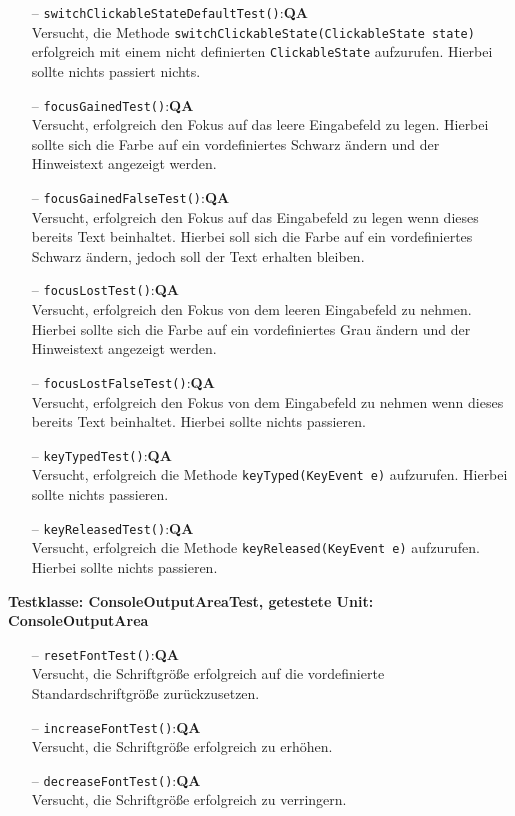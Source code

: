\documentclass[parskip=full,11pt,twoside]{scrartcl}
\def\qa{\hfill\textbf{QA}}
\begin{document}
\begin{itemize}
	\item[--] \texttt{switchClickableStateDefaultTest()}:\qa\\
	Versucht, die Methode \texttt{switchClickableState(ClickableState state)}\\erfolgreich mit einem nicht definierten \texttt{ClickableState} aufzurufen. Hierbei sollte nichts passiert nichts.
	\item[--] \texttt{focusGainedTest()}:\qa\\
	Versucht, erfolgreich den Fokus auf das leere Eingabefeld zu legen. Hierbei sollte sich die Farbe auf ein vordefiniertes Schwarz ändern und der Hinweistext angezeigt werden.
    \newpage
	\item[--] \texttt{focusGainedFalseTest()}:\qa\\
	Versucht, erfolgreich den Fokus auf das Eingabefeld zu legen wenn dieses bereits Text beinhaltet. Hierbei soll sich die Farbe auf ein vordefiniertes Schwarz ändern, jedoch soll der Text erhalten bleiben.
	\item[--] \texttt{focusLostTest()}:\qa\\
	Versucht, erfolgreich den Fokus von dem leeren Eingabefeld zu nehmen. Hierbei sollte sich die Farbe auf ein vordefiniertes Grau ändern und der Hinweistext angezeigt werden.
	\item[--] \texttt{focusLostFalseTest()}:\qa\\
	Versucht, erfolgreich den Fokus von dem Eingabefeld zu nehmen wenn dieses bereits Text beinhaltet. Hierbei sollte nichts passieren.
	\item[--] \texttt{keyTypedTest()}:\qa\\
	Versucht, erfolgreich die Methode \texttt{keyTyped(KeyEvent e)} aufzurufen. Hierbei sollte nichts passieren.
	\item[--] \texttt{keyReleasedTest()}:\qa\\
	Versucht, erfolgreich die Methode \texttt{keyReleased(KeyEvent e)} aufzurufen. Hierbei sollte nichts passieren.
\end{itemize}

\textbf{Testklasse: ConsoleOutputAreaTest, getestete Unit: ConsoleOutputArea}
\begin{itemize}
	\item[--] \texttt{resetFontTest()}:\qa\\
	Versucht, die Schriftgröße erfolgreich auf die vordefinierte Standardschriftgröße zurückzusetzen.
	\item[--] \texttt{increaseFontTest()}:\qa\\
	Versucht, die Schriftgröße erfolgreich zu erhöhen.
	\item[--] \texttt{decreaseFontTest()}:\qa\\
	Versucht, die Schriftgröße erfolgreich zu verringern.
\end{itemize}
\end{document}

